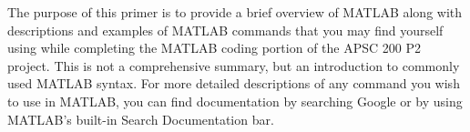 \documentclass[../MATLAB_Primer.tex]{subfiles}
\begin{document}
The purpose of this primer is to provide a brief overview of MATLAB along with descriptions and examples of MATLAB commands that you may find yourself using while completing the MATLAB coding portion of the APSC 200 P2 project. This is not a comprehensive summary, but an introduction to commonly used MATLAB syntax. For more detailed descriptions of any command you wish to use in MATLAB, you can find documentation by searching Google or by using MATLAB's built-in Search Documentation bar.
\end{document}
